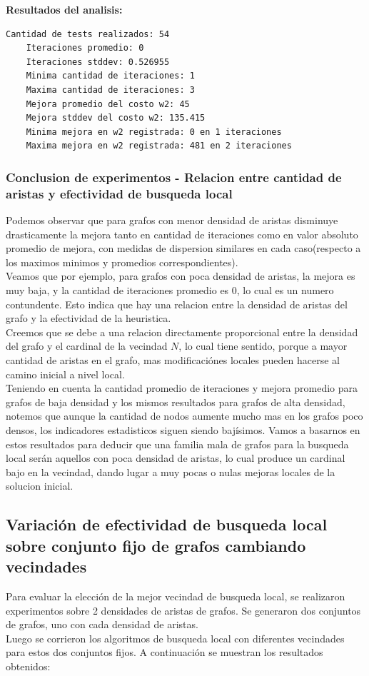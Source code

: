 \vspace{1cm}

\textbf{Resultados del analisis:}
\begin{lstlisting}[frame=single]
	Cantidad de tests realizados: 54
	Iteraciones promedio: 0
	Iteraciones stddev: 0.526955
	Minima cantidad de iteraciones: 1
	Maxima cantidad de iteraciones: 3
	Mejora promedio del costo w2: 45
	Mejora stddev del costo w2: 135.415
	Minima mejora en w2 registrada: 0 en 1 iteraciones
	Maxima mejora en w2 registrada: 481 en 2 iteraciones
\end{lstlisting}

\subsubsection{Conclusion de experimentos - Relacion entre cantidad de aristas y efectividad de busqueda local}
Podemos observar que para grafos con menor densidad de aristas disminuye drasticamente la mejora tanto en cantidad de iteraciones como en valor absoluto promedio de mejora, con medidas de dispersion similares en cada caso(respecto a los maximos minimos y promedios correspondientes).\\
 Veamos que por ejemplo, para grafos con poca densidad de aristas, la mejora es muy baja, y la cantidad de iteraciones promedio es 0, lo cual es un numero contundente. Esto indica que hay una relacion entre la densidad de aristas del grafo y la efectividad de la heuristica.\\
 Creemos que se debe a una relacion directamente proporcional entre la densidad del grafo y el cardinal de la vecindad $N$, lo cual tiene sentido, porque a mayor cantidad de aristas en el grafo, mas modificaci\'ones locales pueden hacerse al camino inicial a nivel local.\\
Teniendo en cuenta la cantidad promedio de iteraciones y mejora promedio para grafos de baja densidad y los mismos resultados para grafos de alta densidad, notemos que aunque la cantidad de nodos aumente mucho mas en los grafos poco densos, los indicadores estadisticos siguen siendo baj\'isimos. Vamos a basarnos en estos resultados para deducir que una familia mala de grafos para la busqueda local ser\'an aquellos con poca densidad de aristas, lo cual produce un cardinal bajo en la vecindad, dando lugar a muy pocas o nulas mejoras locales de la solucion inicial.

\subsection{Variaci\'on de efectividad de busqueda local sobre conjunto fijo de grafos cambiando vecindades}
Para evaluar la elecci\'on de la mejor vecindad de busqueda local, se realizaron experimentos sobre 2 densidades de aristas de grafos. Se generaron dos conjuntos de grafos, uno con cada densidad de aristas.\\
Luego se corrieron los algoritmos de busqueda local con diferentes vecindades para estos dos conjuntos fijos. A continuaci\'on se muestran los resultados obtenidos:

